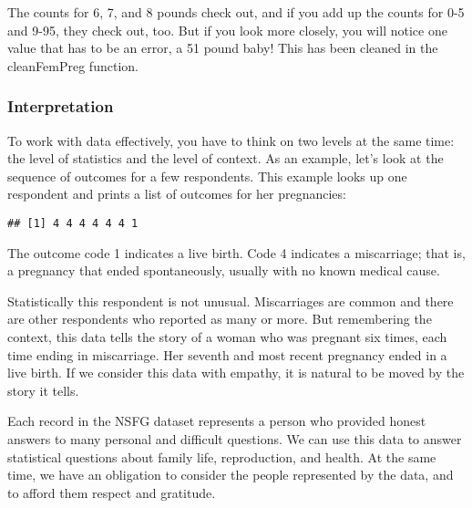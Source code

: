\documentclass[]{article}
\newenvironment{Shaded}{\begin{snugshade}}{\end{snugshade}}
\newcommand{\KeywordTok}[1]{\textcolor[rgb]{0.13,0.29,0.53}{\textbf{#1}}}
\newcommand{\DecValTok}[1]{\textcolor[rgb]{0.00,0.00,0.81}{#1}}
\newcommand{\StringTok}[1]{\textcolor[rgb]{0.31,0.60,0.02}{#1}}
\newcommand{\OperatorTok}[1]{\textcolor[rgb]{0.81,0.36,0.00}{\textbf{#1}}}
\newcommand{\NormalTok}[1]{#1}
\begin{document}
The counts for 6, 7, and 8 pounds check out, and if you add up the
counts for 0-5 and 9-95, they check out, too. But if you look more
closely, you will notice one value that has to be an error, a 51 pound
baby! This has been cleaned in the cleanFemPreg function.

\subsubsection{Interpretation}\label{interpretation}

To work with data effectively, you have to think on two levels at the
same time: the level of statistics and the level of context. As an
example, let's look at the sequence of outcomes for a few respondents.
This example looks up one respondent and prints a list of outcomes for
her pregnancies:

\begin{Shaded}
\end{Shaded}

\begin{verbatim}
## [1] 4 4 4 4 4 4 1
\end{verbatim}

The outcome code 1 indicates a live birth. Code 4 indicates a
miscarriage; that is, a pregnancy that ended spontaneously, usually with
no known medical cause.

Statistically this respondent is not unusual. Miscarriages are common
and there are other respondents who reported as many or more. But
remembering the context, this data tells the story of a woman who was
pregnant six times, each time ending in miscarriage. Her seventh and
most recent pregnancy ended in a live birth. If we consider this data
with empathy, it is natural to be moved by the story it tells.

Each record in the NSFG dataset represents a person who provided honest
answers to many personal and difficult questions. We can use this data
to answer statistical questions about family life, reproduction, and
health. At the same time, we have an obligation to consider the people
represented by the data, and to afford them respect and gratitude.
\end{document}
